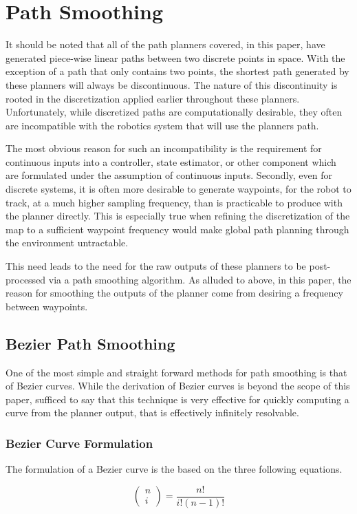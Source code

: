 \section{Path Smoothing}
It should be noted that all of the path planners covered, in this paper, have generated piece-wise linear paths between two discrete points in space. With the exception of a path that only contains two points, the shortest path generated by these planners will always be discontinuous. The nature of this discontinuity is rooted in the discretization applied earlier throughout these planners. Unfortunately, while discretized paths are computationally desirable, they often are incompatible with the robotics system that will use the planners path.

The most obvious reason for such an incompatibility is the requirement for continuous inputs into a controller, state estimator, or other component which are formulated under the assumption of continuous inputs. Secondly, even for discrete systems, it is often more desirable to generate waypoints, for the robot to track, at a much higher sampling frequency, than is practicable to produce with the planner directly. This is especially true when refining the discretization of the map to a sufficient waypoint frequency would make global path planning through the environment untractable.

This need leads to the need for the raw outputs of these planners to be post-processed via a path smoothing algorithm. As alluded to above, in this paper, the reason for smoothing the outputs of the planner come from desiring a frequency between waypoints.

\subsection{Bezier Path Smoothing}
One of the most simple and straight forward methods for path smoothing is that of Bezier curves. While the derivation of Bezier curves is beyond the scope of this paper, sufficed to say that this technique is very effective for quickly computing a curve from the planner output, that is effectively infinitely resolvable.

\subsubsection{Bezier Curve Formulation}
The formulation of a Bezier curve is the based on the three following equations. 

\begin{equation}
    \left(\begin{array}{l}
    n \\
    i
    \end{array}\right)=\frac{n !}{i !(n-1) !}
\end{equation}

